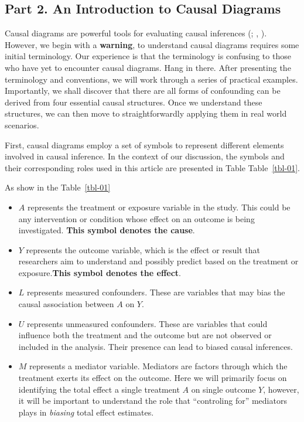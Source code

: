 \documentclass[
  singlecolumn]{article}
\providecommand{\tightlist}{%
  \setlength{\itemsep}{0pt}\setlength{\parskip}{0pt}}\usepackage{longtable,booktabs,array}
\begin{document}
\subsection{Part 2. An Introduction to Causal
Diagrams}\label{part-2.-an-introduction-to-causal-diagrams}

Causal diagrams are powerful tools for evaluating causal inferences
(;
, ).
However, we begin with a \textbf{warning}, to understand causal diagrams
requires some initial terminology. Our experience is that the
terminology is confusing to those who have yet to encounter causal
diagrams. Hang in there. After presenting the terminology and
conventions, we will work through a series of practical examples.
Importantly, we shall discover that there are all forms of confounding
can be derived from four essential causal structures. Once we understand
these structures, we can then move to straightforwardly applying them in
real world scenarios.

First, causal diagrams employ a set of symbols to represent different
elements involved in causal inference. In the context of our discussion,
the symbols and their corresponding roles used in this article are
presented in Table Table~\ref{tbl-01}.

As show in the Table~\ref{tbl-01}

\begin{itemize}
\tightlist
\item
  \textbf{\(A\)} represents the treatment or exposure variable in the
  study. This could be any intervention or condition whose effect on an
  outcome is being investigated. \textbf{This symbol denotes the cause}.
\item
  \textbf{\(Y\)} represents the outcome variable, which is the effect or
  result that researchers aim to understand and possibly predict based
  on the treatment or exposure.\textbf{This symbol denotes the effect}.
\item
  \textbf{\(L\)} represents measured confounders. These are variables
  that may bias the causal association between \(A\) on \(Y\).
\item
  \textbf{\(U\)} represents unmeasured confounders. These are variables
  that could influence both the treatment and the outcome but are not
  observed or included in the analysis. Their presence can lead to
  biased causal inferences.
\item
  \textbf{\(M\)} represents a mediator variable. Mediators are factors
  through which the treatment exerts its effect on the outcome. Here we
  will primarily focus on identifying the total effect a single
  treatment \(A\) on single outcome \(Y\), however, it will be important
  to understand the role that ``controling for'' mediators plays in
  \emph{biasing} total effect estimates.
\end{itemize}
\end{document}
